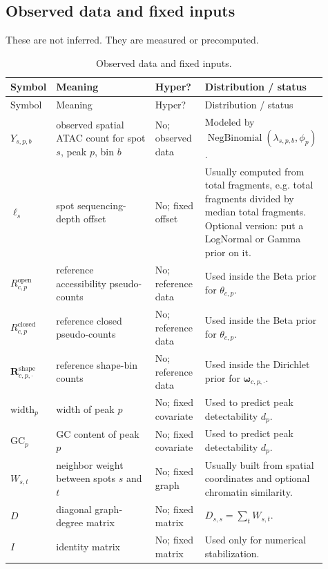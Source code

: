 \documentclass[11pt]{article}
\newcommand{\NB}{\operatorname{NegBinomial}}
\begin{document}
\subsection{Observed data and fixed inputs}

These are not inferred.  They are measured or precomputed.

\begin{longtable}{L{0.14\linewidth}L{0.36\linewidth}C{0.16\linewidth}L{0.25\linewidth}}
\caption{Observed data and fixed inputs.}\label{tab:data}\\
\toprule
Symbol & Meaning & Hyper? & Distribution / status \\
\midrule
\endfirsthead
\toprule
Symbol & Meaning & Hyper? & Distribution / status \\
\midrule
\endhead
\(Y_{s,p,b}\) & observed spatial ATAC count for spot \(s\), peak \(p\), bin \(b\) & No; observed data & Modeled by \(\NB(\lambda_{s,p,b},\phi_p)\). \\
\(\ell_s\) & spot sequencing-depth offset & No; fixed offset & Usually computed from total fragments, e.g. total fragments divided by median total fragments. Optional version: put a LogNormal or Gamma prior on it. \\
\(R_{c,p}^{\mathrm{open}}\) & reference accessibility pseudo-counts & No; reference data & Used inside the Beta prior for \(\theta_{c,p}\). \\
\(R_{c,p}^{\mathrm{closed}}\) & reference closed pseudo-counts & No; reference data & Used inside the Beta prior for \(\theta_{c,p}\). \\
\(\boldsymbol{R}^{\mathrm{shape}}_{c,p,\cdot}\) & reference shape-bin counts & No; reference data & Used inside the Dirichlet prior for \(\boldsymbol{\omega}_{c,p,\cdot}\). \\
\(\mathrm{width}_p\) & width of peak \(p\) & No; fixed covariate & Used to predict peak detectability \(d_p\). \\
\(\mathrm{GC}_p\) & GC content of peak \(p\) & No; fixed covariate & Used to predict peak detectability \(d_p\). \\
\(W_{s,t}\) & neighbor weight between spots \(s\) and \(t\) & No; fixed graph & Usually built from spatial coordinates and optional chromatin similarity. \\
\(D\) & diagonal graph-degree matrix & No; fixed matrix & \(D_{s,s}=\sum_t W_{s,t}\). \\
\(I\) & identity matrix & No; fixed matrix & Used only for numerical stabilization. \\
\bottomrule
\end{longtable}
\end{document}
